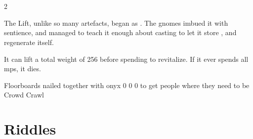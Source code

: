 \printindex[talismans]

\section{}

\begin{multicols}{2}

\noindent
The Lift, unlike so many \glspl{artefact}, began as .
The gnomes imbued it with sentience, and managed to teach it enough about \gls{casting} to let it store , and regenerate itself.

It can lift a total \gls{weight} of 256 before spending  to revitalize.
If it ever spends all \glspl{mp}, it dies.

\columnbreak

  {Floorboards nailed together with onyx}%
  {0}%
  {0}%
  {0}%
  {to get people where they need to be}%
  {Crowd Crawl}%
  {
    \setcounter{Fire}{1}
    \setcounter{Earth}{1}
    \setcounter{Academics}{2}
  }%

\end{multicols}

\newpage
\section{Riddles}
\label{riddles}

